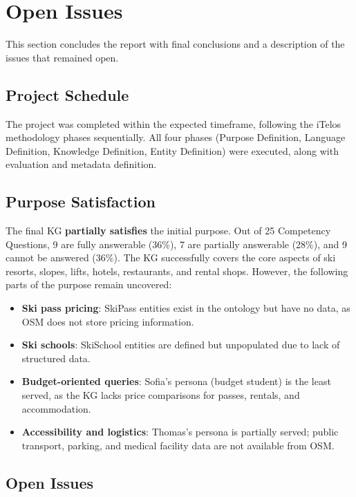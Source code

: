 \section{Open Issues}

This section concludes the report with final conclusions and a description of the issues that remained open.

\subsection{Project Schedule}

The project was completed within the expected timeframe, following the iTelos methodology phases sequentially. All four phases (Purpose Definition, Language Definition, Knowledge Definition, Entity Definition) were executed, along with evaluation and metadata definition.

\subsection{Purpose Satisfaction}

The final KG \textbf{partially satisfies} the initial purpose. Out of 25 Competency Questions, 9 are fully answerable (36\%), 7 are partially answerable (28\%), and 9 cannot be answered (36\%). The KG successfully covers the core aspects of ski resorts, slopes, lifts, hotels, restaurants, and rental shops. However, the following parts of the purpose remain uncovered:
\begin{itemize}
    \item \textbf{Ski pass pricing}: SkiPass entities exist in the ontology but have no data, as OSM does not store pricing information.
    \item \textbf{Ski schools}: SkiSchool entities are defined but unpopulated due to lack of structured data.
    \item \textbf{Budget-oriented queries}: Sofia's persona (budget student) is the least served, as the KG lacks price comparisons for passes, rentals, and accommodation.
    \item \textbf{Accessibility and logistics}: Thomas's persona is partially served; public transport, parking, and medical facility data are not available from OSM.
\end{itemize}

\subsection{Open Issues}

